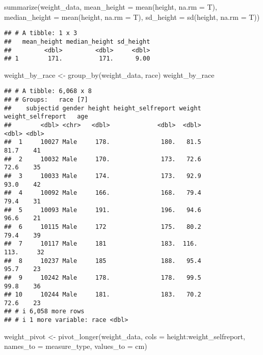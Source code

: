\documentclass[
]{article}
\newenvironment{Shaded}{\begin{snugshade}}{\end{snugshade}}
\newcommand{\AttributeTok}[1]{\textcolor[rgb]{0.77,0.63,0.00}{#1}}
\newcommand{\FunctionTok}[1]{\textcolor[rgb]{0.00,0.00,0.00}{#1}}
\newcommand{\NormalTok}[1]{#1}
\newcommand{\OtherTok}[1]{\textcolor[rgb]{0.56,0.35,0.01}{#1}}
\newcommand{\SpecialCharTok}[1]{\textcolor[rgb]{0.00,0.00,0.00}{#1}}
\newcommand{\StringTok}[1]{\textcolor[rgb]{0.31,0.60,0.02}{#1}}
\begin{document}
\begin{Shaded}
\begin{Highlighting}[]
\FunctionTok{summarize}\NormalTok{(weight\_data,}
          \AttributeTok{mean\_height =} \FunctionTok{mean}\NormalTok{(height, }\AttributeTok{na.rm =}\NormalTok{ T),}
          \AttributeTok{median\_height =} \FunctionTok{mean}\NormalTok{(height, }\AttributeTok{na.rm =}\NormalTok{ T),}
          \AttributeTok{sd\_height =} \FunctionTok{sd}\NormalTok{(height, }\AttributeTok{na.rm =}\NormalTok{ T))}
\end{Highlighting}
\end{Shaded}

\begin{verbatim}
## # A tibble: 1 x 3
##   mean_height median_height sd_height
##         <dbl>         <dbl>     <dbl>
## 1        171.          171.      9.00
\end{verbatim}

\begin{Shaded}
\begin{Highlighting}[]
\NormalTok{weight\_by\_race }\OtherTok{\textless{}{-}} \FunctionTok{group\_by}\NormalTok{(weight\_data, race)}
\NormalTok{weight\_by\_race}
\end{Highlighting}
\end{Shaded}

\begin{verbatim}
## # A tibble: 6,068 x 8
## # Groups:   race [7]
##    subjectid gender height height_selfreport weight weight_selfreport   age
##        <dbl> <chr>   <dbl>             <dbl>  <dbl>             <dbl> <dbl>
##  1     10027 Male     178.              180.   81.5              81.7    41
##  2     10032 Male     170.              173.   72.6              72.6    35
##  3     10033 Male     174.              173.   92.9              93.0    42
##  4     10092 Male     166.              168.   79.4              79.4    31
##  5     10093 Male     191.              196.   94.6              96.6    21
##  6     10115 Male     172               175.   80.2              79.4    39
##  7     10117 Male     181               183.  116.              113.     32
##  8     10237 Male     185               188.   95.4              95.7    23
##  9     10242 Male     178.              178.   99.5              99.8    36
## 10     10244 Male     181.              183.   70.2              72.6    23
## # i 6,058 more rows
## # i 1 more variable: race <dbl>
\end{verbatim}

\begin{Shaded}
\begin{Highlighting}[]
\NormalTok{weight\_pivot }\OtherTok{\textless{}{-}} \FunctionTok{pivot\_longer}\NormalTok{(weight\_data, }\AttributeTok{cols =}\NormalTok{ height}\SpecialCharTok{:}\NormalTok{weight\_selfreport, }\AttributeTok{names\_to =} \StringTok{\textquotesingle{}measure\_type\textquotesingle{}}\NormalTok{, }\AttributeTok{values\_to =} \StringTok{\textquotesingle{}cm\textquotesingle{}}\NormalTok{)}
\end{Highlighting}
\end{Shaded}
\end{document}
